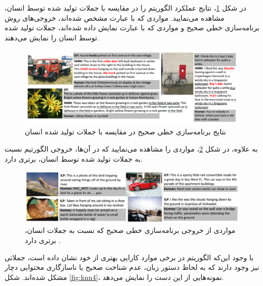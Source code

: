 در شکل \ref{fig:knn2}، نتایج عملکرد الگوریتم را در مقایسه با جملات تولید شده توسط انسان، مشاهده می‌نمایید. مواردی که با عبارت  مشخص شده‌اند، خروجی‌های روش برنامه‌سازی خطی صحیح و مواردی که با عبارت  نمایش داده شده‌اند، جملات تولید شده توسط انسان را نمایش می‌دهند.

\begin{figure}[H]
\center
\includegraphics[scale=0.5]{Imgs/sentence_knn2.png}
\caption{نتایج برنامه‌سازی خطی صحیح در مقایسه با جملات تولید شده انسان \cite{kuznetsova2012collective}}
\label{fig:knn2}
\end{figure}

به علاوه، در شکل \ref{fig:knn3}، مواردی را مشاهده می‌نمایید که در آن‌ها، خروجی الگورتیم نسبت به جملات تولید شده توسط انسان، برتری دارد.


\begin{figure}[H]
\center
\includegraphics[scale=0.5]{Imgs/sentence_knn3.png}
\caption{مواردی از خروجی برنامه‌سازی خطی صحیح که نسبت به جملات انسان، برتری دارد \cite{kuznetsova2012collective}.}
\label{fig:knn3}
\end{figure}

با وجود این‌که الگوریتم در برخی موارد کارایی بهتری از خود نشان داده‌ است، جملاتی نیز وجود دارند که به لحاظ دستور زبان، عدم شناخت صحیح یا ناسازگاری محتوایی دچار مشکل شده‌اند. شکل \ref{fig:knn4}، نمونه‌هایی از این دست را نمایش می‌دهد.


